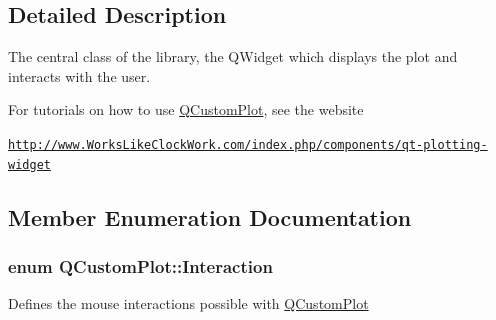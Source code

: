 \subsection{Detailed Description}
The central class of the library, the Q\-Widget which displays the plot and interacts with the user. 

For tutorials on how to use \hyperlink{classQCustomPlot}{Q\-Custom\-Plot}, see the website\par
 \href{http://www.WorksLikeClockWork.com/index.php/components/qt-plotting-widget}{\tt http\-://www.\-Works\-Like\-Clock\-Work.\-com/index.\-php/components/qt-\/plotting-\/widget} 

\subsection{Member Enumeration Documentation}
\hypertarget{classQCustomPlot_acc82d021129b61e550e36747d2e76d3a}{
\subsubsection[{Interaction}]{\setlength{\rightskip}{0pt plus 5cm}enum {\bf Q\-Custom\-Plot\-::\-Interaction}}}\label{classQCustomPlot_acc82d021129b61e550e36747d2e76d3a}
Defines the mouse interactions possible with \hyperlink{classQCustomPlot}{Q\-Custom\-Plot}

